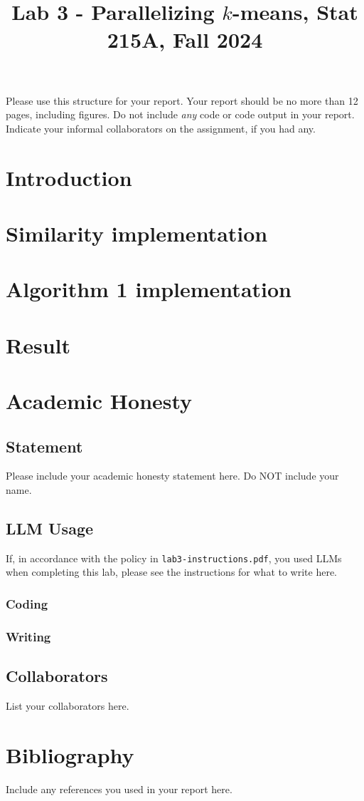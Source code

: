 \documentclass[10pt,letterpaper]{article}
\title{Lab 3 - Parallelizing $k$-means, Stat 215A, Fall 2024\vspace{-2em}}
\begin{document}
\maketitle

Please use this structure for your report. Your report should be no more than 12 pages, including figures. Do not include \emph{any} code or code output in your report. Indicate your informal collaborators on the assignment, if you had any.

\section{Introduction}\label{introduction}

\section{Similarity implementation}

\section{Algorithm 1 implementation}

\section{Result}

\section{Academic Honesty}

\subsection{Statement}
Please include your academic honesty statement here. Do NOT include your name.

\subsection{LLM Usage}
If, in accordance with the policy in \texttt{lab3-instructions.pdf}, you used LLMs when completing this lab, please see the instructions for what to write here.

\subsubsection*{Coding}

\subsubsection*{Writing}

\subsection{Collaborators}
List your collaborators here.
\section{Bibliography}
Include any references you used in your report here.
\end{document}
